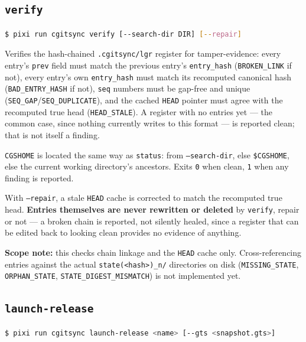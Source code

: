 \subsection{\texttt{verify}}

\begin{lstlisting}[language=bash]
$ pixi run cgitsync verify [--search-dir DIR] [--repair]
\end{lstlisting}

Verifies the hash-chained \texttt{.cgitsync/lgr} register for
tamper-evidence: every entry's \texttt{prev} field must match the previous
entry's \texttt{entry\_hash} (\texttt{BROKEN\_LINK} if not), every entry's own
\texttt{entry\_hash} must match its recomputed canonical hash
(\texttt{BAD\_ENTRY\_HASH} if not), \texttt{seq} numbers must be gap-free and
unique (\texttt{SEQ\_GAP}/\texttt{SEQ\_DUPLICATE}), and the cached \texttt{HEAD}
pointer must agree with the recomputed true head (\texttt{HEAD\_STALE}). A
register with no entries yet — the common case, since nothing currently
writes to this format — is reported clean; that is not itself a finding.

\texttt{CGSHOME} is located the same way as \texttt{status}: from
\texttt{--search-dir}, else \texttt{\$CGSHOME}, else the current working
directory's ancestors. Exits \texttt{0} when clean, \texttt{1} when any
finding is reported.

With \texttt{--repair}, a stale \texttt{HEAD} cache is corrected to match the
recomputed true head. \textbf{Entries themselves are never rewritten or
deleted} by \texttt{verify}, repair or not — a broken chain is reported, not
silently healed, since a register that can be edited back to looking clean
provides no evidence of anything.

\textbf{Scope note:} this checks chain linkage and the \texttt{HEAD} cache
only. Cross-referencing entries against the actual
\texttt{state(<hash>)\_n/} directories on disk (\texttt{MISSING\_STATE},
\texttt{ORPHAN\_STATE}, \texttt{STATE\_DIGEST\_MISMATCH}) is not implemented
yet.

\subsection{\texttt{launch-release}}

\begin{lstlisting}[language=bash]
$ pixi run cgitsync launch-release <name> [--gts <snapshot.gts>]
\end{lstlisting}

